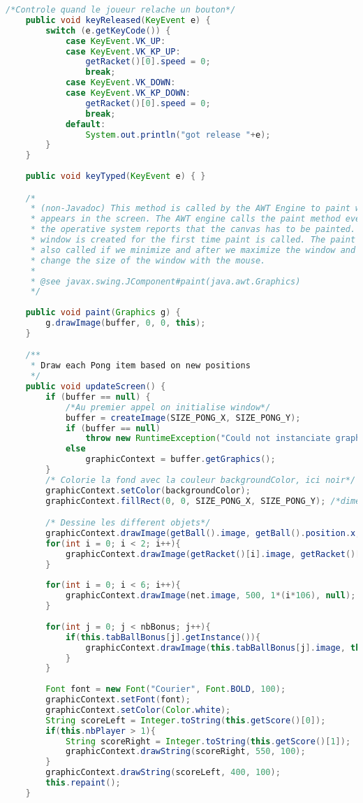\begin{lstlisting}[language=Java]
	/*Controle quand le joueur relache un bouton*/
	public void keyReleased(KeyEvent e) {
		switch (e.getKeyCode()) {
			case KeyEvent.VK_UP:
			case KeyEvent.VK_KP_UP:
				getRacket()[0].speed = 0;
				break;
			case KeyEvent.VK_DOWN:
			case KeyEvent.VK_KP_DOWN:
				getRacket()[0].speed = 0;
				break;
			default:
				System.out.println("got release "+e);
		}
	}
	
	public void keyTyped(KeyEvent e) { }

	/*
	 * (non-Javadoc) This method is called by the AWT Engine to paint what
	 * appears in the screen. The AWT engine calls the paint method every time
	 * the operative system reports that the canvas has to be painted. When the
	 * window is created for the first time paint is called. The paint method is
	 * also called if we minimize and after we maximize the window and if we
	 * change the size of the window with the mouse.
	 * 
	 * @see javax.swing.JComponent#paint(java.awt.Graphics)
	 */
	
	public void paint(Graphics g) {
		g.drawImage(buffer, 0, 0, this);
	}

	/**
	 * Draw each Pong item based on new positions
	 */
	public void updateScreen() {
		if (buffer == null) {
			/*Au premier appel on initialise window*/
			buffer = createImage(SIZE_PONG_X, SIZE_PONG_Y);
			if (buffer == null)
				throw new RuntimeException("Could not instanciate graphics");
			else
				graphicContext = buffer.getGraphics();
		}
		/* Colorie la fond avec la couleur backgroundColor, ici noir*/
		graphicContext.setColor(backgroundColor);
		graphicContext.fillRect(0, 0, SIZE_PONG_X, SIZE_PONG_Y); /*dimension de la fenetre*/

		/* Dessine les different objets*/
		graphicContext.drawImage(getBall().image, getBall().position.x, getBall().position.y, getBall().width, getBall().height, null);
		for(int i = 0; i < 2; i++){
			graphicContext.drawImage(getRacket()[i].image, getRacket()[i].position.x, getRacket()[i].position.y, getRacket()[i].width, getRacket()[i].height, null);
		}
		
		for(int i = 0; i < 6; i++){
			graphicContext.drawImage(net.image, 500, 1*(i*106), null);
		}
		
		for(int j = 0; j < nbBonus; j++){
			if(this.tabBallBonus[j].getInstance()){
				graphicContext.drawImage(this.tabBallBonus[j].image, this.tabBallBonus[j].position.x, this.tabBallBonus[j].position.y, this.tabBallBonus[j].width, this.tabBallBonus[j].height, null);
			}
		}
		
		Font font = new Font("Courier", Font.BOLD, 100);
		graphicContext.setFont(font);
		graphicContext.setColor(Color.white);
		String scoreLeft = Integer.toString(this.getScore()[0]);
		if(this.nbPlayer > 1){
			String scoreRight = Integer.toString(this.getScore()[1]);
			graphicContext.drawString(scoreRight, 550, 100);
		}
		graphicContext.drawString(scoreLeft, 400, 100);
		this.repaint();
	}


\end{lstlisting}
